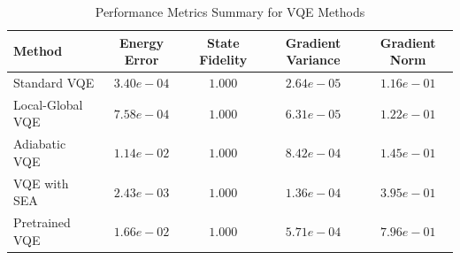 \begin{table}[h!]
\centering
\caption{Performance Metrics Summary for VQE Methods}
\label{tab:performance_metrics}
\begin{tabular}{lcccc}
\hline
\textbf{Method} & \textbf{Energy Error} & \textbf{State Fidelity} & \textbf{Gradient Variance} & \textbf{Gradient Norm} \\
\hline
Standard VQE & $3.40e-04$ & $1.000$ & $2.64e-05$ & $1.16e-01$ \\
Local-Global VQE & $7.58e-04$ & $1.000$ & $6.31e-05$ & $1.22e-01$ \\
Adiabatic VQE & $1.14e-02$ & $1.000$ & $8.42e-04$ & $1.45e-01$ \\
VQE with SEA & $2.43e-03$ & $1.000$ & $1.36e-04$ & $3.95e-01$ \\
Pretrained VQE & $1.66e-02$ & $1.000$ & $5.71e-04$ & $7.96e-01$ \\
\hline
\end{tabular}
\end{table}